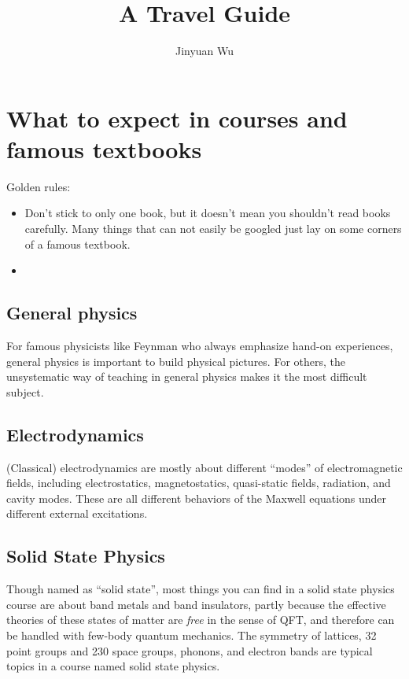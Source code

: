 \documentclass[hyperref, a4paper]{article}
\title{A Travel Guide}
\author{Jinyuan Wu}
\begin{document}
\maketitle

\section{What to expect in courses and famous textbooks}


Golden rules:
\begin{itemize}
    \item Don't stick to only one book, but it doesn't mean you shouldn't read books carefully. Many things that 
    can not easily be googled just lay on some corners of a famous textbook.
    \item 
\end{itemize}

\subsection{General physics}

For famous physicists like Feynman who always emphasize hand-on experiences, general physics is important to build 
physical pictures. For others, the unsystematic way of teaching in general physics makes it the most difficult 
subject. 

\subsection{Electrodynamics}

(Classical) electrodynamics are mostly about different ``modes'' of electromagnetic fields, including 
electrostatics, magnetostatics, quasi-static fields, radiation, and cavity modes. These are all different 
behaviors of the Maxwell equations under different external excitations.  

\subsection{Solid State Physics}

Though named as ``solid state'', most things you can find in a solid state physics course are about band metals 
and band insulators, partly because the effective theories of these states of matter are \emph{free} in the sense 
of QFT, and therefore can be handled with few-body quantum mechanics. The symmetry of lattices, 32 point groups 
and 230 space groups, phonons, and electron bands are typical topics in a course named solid state physics.
\end{document}
